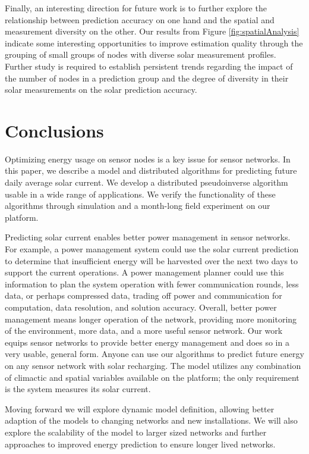 \documentclass[prodmode,acmtosn]{acmsmall}
\begin{document}
Finally,  an interesting direction for future work  is to further explore the relationship between prediction accuracy on one hand and the spatial and measurement diversity on the other.
Our results from Figure \ref{fig:spatialAnalysis} indicate some interesting opportunities to improve estimation quality through the grouping of  small groups of nodes with diverse solar measurement profiles. Further study is required to establish persistent trends regarding the impact of the number of nodes in a prediction group and the degree of diversity in their solar measurements on  the solar prediction accuracy.

\section{Conclusions} \label{sec:solar-conc}
Optimizing energy usage on sensor nodes is a key issue for sensor networks.
In this paper, we describe a model and distributed algorithms for predicting future daily average solar current.
We develop a distributed pseudoinverse algorithm usable in a wide range of applications.
We verify the functionality of these algorithms through simulation and a month-long field experiment on our platform.

Predicting solar current enables better power management in sensor networks.
For example, a power management system could use the solar current prediction to determine that insufficient energy will be harvested over the next two days to support the current operations.
A power management planner could use this information to plan the system operation with fewer communication rounds, less data, or perhaps compressed data, trading off power and communication for computation, data resolution, and solution accuracy.
Overall, better power management means longer operation of the network, providing more monitoring of the environment, more data, and a more useful sensor network.
Our work equips sensor networks to provide better energy management and does so in a very usable, general form. 
Anyone can use our algorithms to predict future energy on any sensor network with solar recharging.
The model utilizes any combination of climactic and spatial variables available on the platform; the only requirement is the system measures its solar current.

Moving forward we will explore dynamic model definition, allowing better adaption of the models to changing networks and new installations.
We will also explore the scalability of the model to larger sized networks and further approaches to improved energy prediction to ensure longer lived networks.
\end{document}
